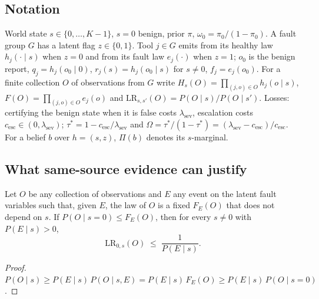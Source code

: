 
\subsection*{Notation}
World state $s\in\{0,\dots,K-1\}$, $s=0$ benign, prior $\pi$, $\omega_0=\pi_0/(1-\pi_0)$.
A fault group $G$ has a latent flag $z\in\{0,1\}$. Tool $j\in G$ emits from its healthy law
$h_j(\cdot\mid s)$ when $z=0$ and from its fault law $e_j(\cdot)$ when $z=1$; $o_0$ is the benign report,
$q_j=h_j(o_0\mid 0)$, $r_j(s)=h_j(o_0\mid s)$ for $s\neq0$, $f_j=e_j(o_0)$.
For a finite collection $O$ of observations from $G$ write
$H_s(O)=\prod_{(j,o)\in O}h_j(o\mid s)$, $F(O)=\prod_{(j,o)\in O}e_j(o)$ and
$\mathrm{LR}_{s,s'}(O)=P(O\mid s)/P(O\mid s')$.
Losses: certifying the benign state when it is false costs $\lambda_{\mathrm{sev}}$, escalation costs
$c_{\mathrm{esc}}\in(0,\lambda_{\mathrm{sev}})$; $\tau^*=1-c_{\mathrm{esc}}/\lambda_{\mathrm{sev}}$ and
$\Omega=\tau^*/(1-\tau^*)=(\lambda_{\mathrm{sev}}-c_{\mathrm{esc}})/c_{\mathrm{esc}}$.
For a belief $b$ over $h=(s,z)$, $\Pi(b)$ denotes its $s$-marginal.

\subsection{What same-source evidence can justify}

\begin{lemma}\label{lem:event}
Let $O$ be any collection of observations and $E$ any event on the latent fault variables such that, given $E$,
the law of $O$ is a fixed $F_E(O)$ that does not depend on $s$. If $P(O\mid s=0)\le F_E(O)$, then for every $s\neq0$
with $P(E\mid s)>0$,
\[
\mathrm{LR}_{0,s}(O)\;\le\;\frac{1}{P(E\mid s)} .
\]
\end{lemma}
\begin{proof}
$P(O\mid s)\ge P(E\mid s)\,P(O\mid s,E)=P(E\mid s)\,F_E(O)\ge P(E\mid s)\,P(O\mid s=0)$.
\end{proof}

